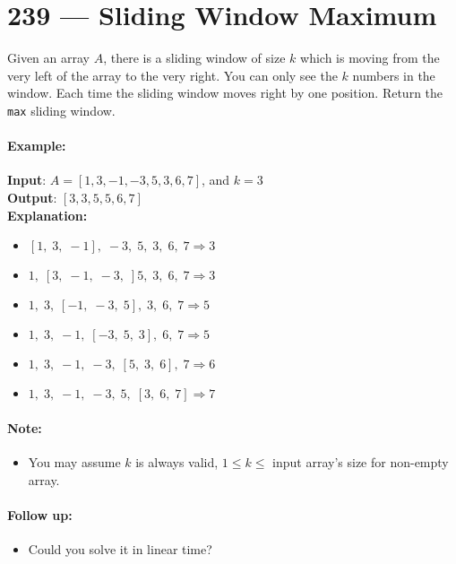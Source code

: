 \section{239 --- Sliding Window Maximum}
Given an array $A$, there is a sliding window of size $k$ which is moving from the very left of the array to the very right. You can only see the $k$ numbers in the window. Each time the sliding window moves right by one position. Return the \texttt{max} sliding window.

\paragraph{Example:}
\begin{flushleft}
\textbf{Input}: $A = [1,3,-1,-3,5,3,6,7]$, and $k = 3$
\\
\textbf{Output}: $[3,3,5,5,6,7]$
\\
\textbf{Explanation:} 
\begin{itemize}
\item $[1,\;  3,\;  -1],\; -3,\;  5,\;  3,\;  6,\;  7 \Longrightarrow       3$
\item $1,\; [3,\;  -1,\;  -3,\;] 5,\;  3,\;  6,\;  7 \Longrightarrow       3$
\item $1,\;  3,\; [-1,\;  -3,\;  5],\; 3,\;  6,\;  7 \Longrightarrow 5$
\item $1,\; 3,\; -1,\;[-3,\; 5,\; 3],\; 6,\; 7 \Longrightarrow 5$
\item $1,\;  3,\;  -1,\;  -3,\; [5,\;  3,\;  6],\; 7 \Longrightarrow       6$
\item $1,\; 3,\; -1,\;  -3,\;  5,\; [3,\;  6,\;  7]  \Longrightarrow  7$
\end{itemize}
\end{flushleft}
\paragraph{Note:}
\begin{itemize}
\item You may assume $k$ is always valid, $1 \leq k \leq$ input array's size for non-empty array.
\end{itemize}
\paragraph{Follow up:}
\begin{itemize}
\item Could you solve it in linear time?
\end{itemize}
